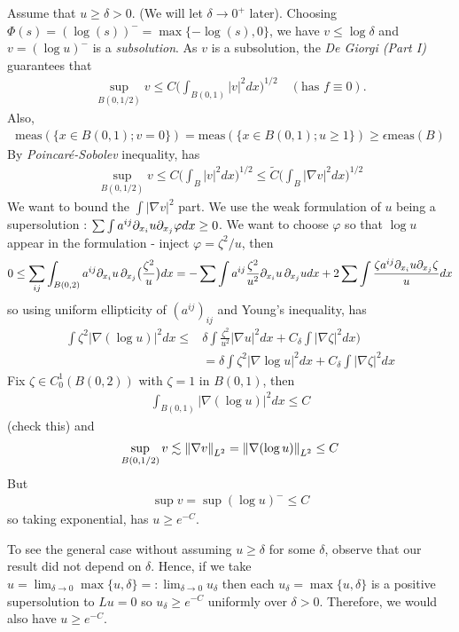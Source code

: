 \documentclass[12pt,a4paper]{article}
\newenvironment{proof}
{\begin{changemargin}{0.5cm}{0.5cm} 
	}%
	{\end{changemargin}
}
\newenvironment{p}
{\begin{proof} 
	}%
	{\end{proof}
}
\begin{document}
\begin{p}
\pf Assume that $u\geq \delta >0$. (We will let $\delta \rightarrow 0^+$ later). Choosing $\Phi(s) = (\log(s))^- = \max \{-\log(s), 0\}$, we have $v \leq \log \delta$ and $v =(\log u)^-$ is a \emph{subsolution}. As $v$ is a subsolution, the \emph{De Giorgi (Part I)} guarantees that
\begin{align*}
\sup_{B(0,1/2)} v \leq C\Big( \int_{B(0,1)} |v|^2 dx \Big)^{1/2} \quad (\text{has } f\equiv 0).
\end{align*}
Also,
\begin{align*}
\text{meas}(\{x\in B(0,1) ; v=0\}) = \text{meas}(\{x\in B(0,1) ; u\geq 1\}) \geq \epsilon \text{meas}(B)
\end{align*}
By \emph{Poincar\'e-Sobolev} inequality, has
\begin{align*}
\sup_{B(0, 1/2)} v \leq C\Big( \int_B |v|^2 dx \Big)^{1/2} \leq \tilde{C} \Big( \int_B |\nabla v|^2 dx\Big)^{1/2}
\end{align*}
We want to bound the $\int |\nabla v|^2$ part. We use the weak formulation of $u$ being a supersolution : $\sum \int a^{ij}\partial_{x_i} u\partial_{x_j} \varphi dx \geq 0$. We want to choose $\varphi$ so that $\log u$ appear in the formulation - inject $\varphi = \zeta^2 /u$, then
\begin{align*}
0 \leq \sum_{ij} \int_{B(0,2)} a^{ij} \partial_{x_i} u \, \partial_{x_j} \big(\frac{\zeta^2}{u} \big) dx = - \sum \int a^{ij} \frac{\zeta^2}{u^2} \partial_{x_i} u \, \partial_{x_j} u dx + 2\sum \int \frac{\zeta a^{ij} \partial_{x_i}u \partial_{x_j} \zeta}{u} dx
\end{align*}
so using uniform ellipticity of $(a^{ij})_{ij}$ and Young's inequality, has
\begin{align*}
\int \zeta^2 |\nabla (\log u)|^2 dx \leq & \delta \int \frac{\zeta^2}{u^2} |\nabla u|^2 dx + C_{\delta} \int |\nabla \zeta|^2 dx \Big) \\
&= \delta \int \zeta^2 |\nabla \log u|^2 dx + C_{\delta}\int |\nabla \zeta|^2 dx
\end{align*}
Fix $\zeta \in C_0^1(B(0,2))$ with $\zeta =1$ in $B(0,1)$, then
\begin{align*}
\int_{B(0,1)} |\nabla (\log u)|^2 dx \leq C 
\end{align*}
(check this) and
\begin{align*}
\sup_{B(0,1/2)} v \lesssim \snorms{\nabla v}{L^2} = \snorms{\nabla (\log u)}{L^2} \leq C
\end{align*}
But
\begin{align*}
\sup v = \sup(\log u)^- \leq C
\end{align*}
so taking exponential, has $u\geq e^{-C}$.
\s

To see the general case without assuming $u\geq \delta$ for some $\delta$, observe that our result did not depend on $\delta$. Hence, if we take $u = \lim_{\delta \rightarrow 0} \max \{u, \delta\} =: \lim_{\delta \rightarrow 0} u_{\delta}$ then each $u_{\delta} = \max \{u, \delta\}$ is a positive supersolution to $Lu =0$ so $u_{\delta} \geq e^{-C}$ uniformly over $\delta>0$. Therefore, we would also have $u\geq e^{-C}$.
 
\eop 
\end{p}
\s
\end{document}
